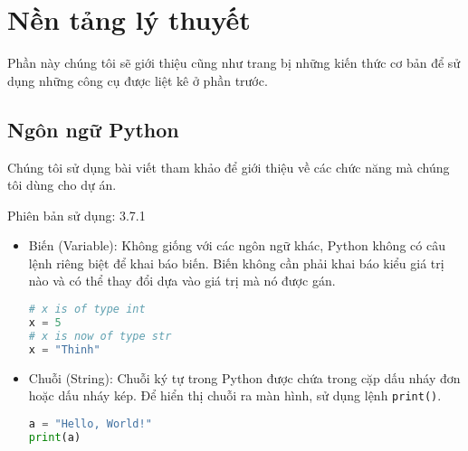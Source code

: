 \chapter{Nền tảng lý thuyết}
Phần này chúng tôi sẽ giới thiệu cũng như trang bị những kiến thức cơ bản để sử dụng những công cụ được liệt kê ở phần trước.
\section{Ngôn ngữ Python}
Chúng tôi sử dụng bài viết tham khảo\cite{python} để giới thiệu về các chức năng mà chúng tôi dùng cho dự án.
\\\par
Phiên bản sử dụng: 3.7.1
\begin{itemize}
	\item Biến (Variable): Không giống với các ngôn ngữ khác, Python không có câu lệnh riêng biệt để khai báo biến. Biến không cần phải khai báo kiểu giá trị nào và có thể thay đổi dựa vào giá trị mà nó được gán.
	\begin{lstlisting}[language=Python]
# x is of type int
x = 5
# x is now of type str
x = "Thinh"
	\end{lstlisting}
	\item Chuỗi (String): Chuỗi ký tự trong Python được chứa trong cặp dấu nháy đơn hoặc dấu nháy kép. Để hiển thị chuỗi ra màn hình, sử dụng lệnh \texttt{print()}.
	\begin{lstlisting}[language=Python]
a = "Hello, World!"
print(a)


\end{lstlisting}
\end{itemize}

